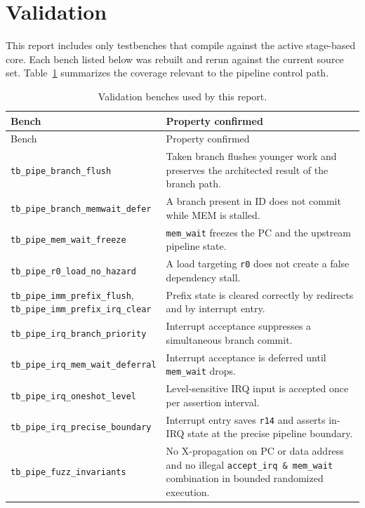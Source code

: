 \documentclass[11pt,a4paper]{article}
\begin{document}
\section{Validation}

This report includes only testbenches that compile against the active stage-based core. Each bench listed below was rebuilt and rerun against the current source set. Table~\ref{tab:validation} summarizes the coverage relevant to the pipeline control path.

\begin{longtable}{@{}p{0.36\linewidth}p{0.66\linewidth}@{}}
\caption{Validation benches used by this report.}\label{tab:validation}\\
\toprule
Bench & Property confirmed \\
\midrule
\endfirsthead

\toprule
Bench & Property confirmed \\
\midrule
\endhead

\bottomrule
\endfoot

\texttt{tb\_pipe\_branch\_flush} & Taken branch flushes younger work and preserves the architected result of the branch path. \\
\texttt{tb\_pipe\_branch\_memwait\_defer} & A branch present in ID does not commit while MEM is stalled. \\
\texttt{tb\_pipe\_mem\_wait\_freeze} & \texttt{mem\_wait} freezes the PC and the upstream pipeline state. \\
\texttt{tb\_pipe\_r0\_load\_no\_hazard} & A load targeting \texttt{r0} does not create a false dependency stall. \\
\texttt{tb\_pipe\_imm\_prefix\_flush}, \texttt{tb\_pipe\_imm\_prefix\_irq\_clear} & Prefix state is cleared correctly by redirects and by interrupt entry. \\
\texttt{tb\_pipe\_irq\_branch\_priority} & Interrupt acceptance suppresses a simultaneous branch commit. \\
\texttt{tb\_pipe\_irq\_mem\_wait\_deferral} & Interrupt acceptance is deferred until \texttt{mem\_wait} drops. \\
\texttt{tb\_pipe\_irq\_oneshot\_level} & Level-sensitive IRQ input is accepted once per assertion interval. \\
\texttt{tb\_pipe\_irq\_precise\_boundary} & Interrupt entry saves \texttt{r14} and asserts in-IRQ state at the precise pipeline boundary. \\
\texttt{tb\_pipe\_fuzz\_invariants} & No X-propagation on PC or data address and no illegal \texttt{accept\_irq \& mem\_wait} combination in bounded randomized execution. \\
\end{longtable}
\end{document}
